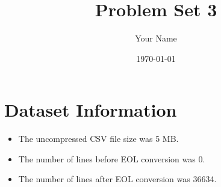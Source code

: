 \documentclass{article}
\begin{document}
\title{Problem Set 3}
\author{Your Name}
\date{\today}
\maketitle

\section{Dataset Information}
\begin{itemize}
    \item The uncompressed CSV file size was 5 MB.
    \item The number of lines before EOL conversion was 0.
    \item The number of lines after EOL conversion was 36634.
\end{itemize}
\end{document}
